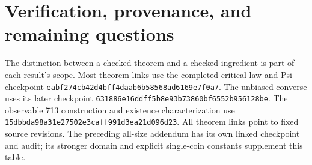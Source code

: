 \section{Verification, provenance, and remaining questions}\label{sec:verification}
The distinction between a checked theorem and a checked ingredient is
part of each result's scope. Most theorem links use the completed critical-law
and Psi checkpoint \nolinkurl{eabf274cb42d4bff4daab6b58568ad6169e7f0a7}.
The unbiased converse uses its later checkpoint
\nolinkurl{631886e16ddff5b8e93b73860bf6552b956128be}.
The observable 713 construction and existence characterization use
\nolinkurl{15dbbda98a31e27502e3caff991d3ea21d096d23}.
All theorem links point to fixed source revisions.
The preceding all-size addendum has its own linked checkpoint and audit;
its stronger domain and explicit single-coin constants supplement this table.

